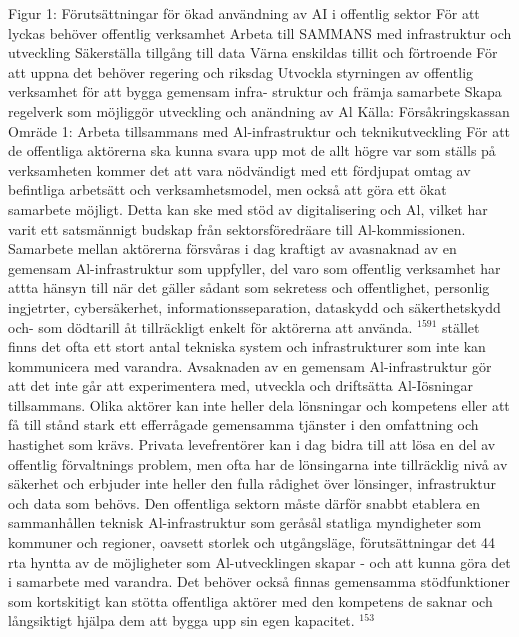 {{{{{{{{{{{{{{{{{{Figur 1: Förutsättningar för ökad användning av AI i offentlig sektor
För att lyckas behöver offentlig
verksamhet
Arbeta till SAMMANS med
infrastruktur och utveckling
Säkerställa tillgång till data
Värna enskildas tillit och förtroende
För att uppna det behöver
regering och riksdag
Utvockla styrningen av
offentlig verksamhet för
att bygga gemensam infra-
struktur och främja samarbete
Skapa regelverk som
möjliggör utveckling och
anändning av Al
Källa: Försåkringskassan
Omräde 1: Arbeta tillsammans med Al-infrastruktur och teknikutveckling
För att de offentliga aktörerna ska kunna svara upp mot de allt högre var som ställs på verksamheten kommer det att vara nödvändigt med ett fördjupat omtag av befintliga arbetsätt och verksamhetsmodel, men också att göra ett ökat samarbete möjligt. Detta kan ske med stöd av digitalisering och Al, vilket har varit ett satsmännigt budskap från sektorsföredräare till Al-kommissionen.
Samarbete mellan aktörerna försvåras i dag kraftigt av avasnaknad av en gemensam Al-infrastruktur som uppfyller, del varo som offentlig verksamhet har attta hänsyn till när det gäller sådant som sekretess och offentlighet, personlig ingjetrter, cybersäkerhet, informationsseparation, dataskydd och säkerthetskydd och- som dödtarill åt tillräckligt enkelt för aktörerna att använda. \({ }^{1591}\) stället finns det ofta ett stort antal tekniska system och infrastrukturer som inte kan kommunicera med varandra.
Avsaknaden av en gemensam Al-infrastruktur gör att det inte går att experimentera med, utveckla och driftsätta Al-Iösningar tillsammans. Olika aktörer kan inte heller dela lönsningar och kompetens eller att få till stånd stark ett efferrågade gemensamma tjänster i den omfattning och hastighet som krävs. Privata levefrentörer kan i dag bidra till att lösa en del av offentlig förvaltnings problem, men ofta har de lönsingarna
inte tillräcklig nivå av säkerhet och erbjuder inte heller den fulla rådighet över lönsinger, infrastruktur och data som behövs.
Den offentliga sektorn måste därför snabbt etablera en sammanhållen teknisk Al-infrastruktur som geråsål statliga myndigheter som kommuner och regioner, oavsett storlek och utgångsläge, förutsättningar det 44 rta hyntta av de möjligheter som Al-utvecklingen skapar - och att kunna göra det i samarbete med varandra. Det behöver också finnas gemensamma stödfunktioner som kortskitigt kan stötta offentliga aktörer med den kompetens de saknar och långsiktigt hjälpa dem att bygga upp sin egen kapacitet. \({ }^{153}\)
}}}}}}}}}}}}}}}}}}
